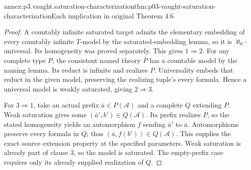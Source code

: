 \begin{annexitem}{annex:p3.vaught.saturation-characterization}{thm:p03-vaught-saturation-characterization}{Each implication in original Theorem 4.6}
\begin{proof}
A countably infinite saturated target admits the elementary
embedding of every countably infinite \(T\)-model by the
saturated-embedding lemma, so it is \(\aleph_0\)-universal.
Its homogeneity was proved separately. This gives \(1\Rightarrow2\).
For any complete type \(P\), the consistent named theory
\(\overline P\) has a countable model by the naming lemma.
Its reduct is infinite and realizes \(P\).
Universality embeds that reduct in the given model, preserving
the realizing tuple's every formula. Hence a universal model
is weakly saturated, giving \(2\Rightarrow3\).

For \(3\Rightarrow1\), take an actual prefix
\(\bar a\in P(\mathcal A)\) and a complete \(Q\) extending \(P\).
Weak saturation gives some \((\bar a',b')\in Q(\mathcal A)\).
Its prefix realizes \(P\), so the stated homogeneity yields an
automorphism \(f\) sending \(\bar a'\) to \(\bar a\).
Automorphisms preserve every formula in \(Q\); thus
\((\bar a,f(b'))\in Q(\mathcal A)\).
This supplies the exact source extension property at the specified
parameters. Weak saturation is already part of clause 3, so
the model is saturated. The empty-prefix case requires only
its already supplied realization of \(Q\).
\end{proof}
\end{annexitem}

